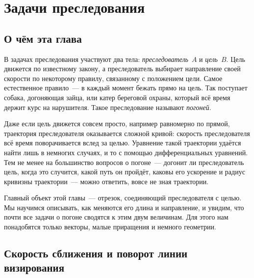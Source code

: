 \documentclass[../main.tex]{subfiles}
\begin{document}
\setcounter{section}{3}
\section{Задачи преследования}

\subsection{О чём эта глава}

В задачах преследования участвуют два тела: \textit{преследователь}~$A$ и
\textit{цель}~$B$. Цель движется по известному закону, а преследователь выбирает
направление своей скорости по некоторому правилу, связанному с положением цели.
Самое естественное правило~--- в каждый момент бежать прямо на цель. Так поступает
собака, догоняющая зайца, или катер береговой охраны, который всё время держит курс
на нарушителя. Такое преследование называют \textit{погоней}.

Даже если цель движется совсем просто, например равномерно по прямой, траектория
преследователя оказывается сложной кривой: скорость преследователя всё время
поворачивается вслед за целью. Уравнение такой траектории удаётся найти лишь в
немногих случаях, и то с помощью дифференциальных уравнений. Тем не менее на
большинство вопросов о погоне~--- догонит ли преследователь цель, когда это
случится, какой путь он пройдёт, каковы его ускорение и радиус кривизны
траектории~--- можно ответить, вовсе не зная траектории.

Главный объект этой главы~--- отрезок, соединяющий преследователя с целью. Мы
научимся описывать, как меняются его длина и направление, и увидим, что почти все
задачи о погоне сводятся к этим двум величинам. Для этого нам понадобятся только
векторы, малые приращения и немного геометрии.

\subsection{Скорость сближения и поворот линии визирования}
\end{document}
